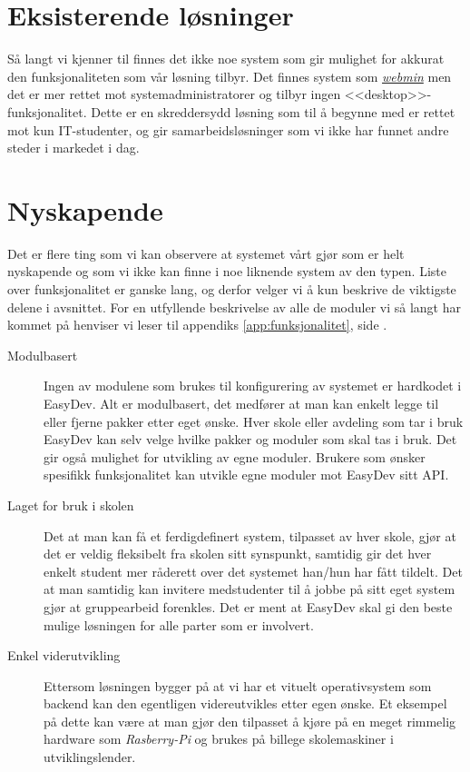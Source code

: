 \section{Eksisterende løsninger}
Så langt vi kjenner til finnes det ikke noe system som gir mulighet for akkurat den funksjonaliteten som vår løsning tilbyr. Det finnes system som \href{http://en.wikipedia.org/wiki/Webmin}{\textit{webmin}} men det er mer rettet mot systemadministratorer og tilbyr ingen <<desktop>>-funksjonalitet. Dette er en skreddersydd løsning som til å begynne med er rettet mot kun IT-studenter, og gir samarbeidsløsninger som vi ikke har funnet andre steder i markedet i dag.

\section{Nyskapende}
Det er flere ting som vi kan observere at systemet vårt gjør som er helt nyskapende og som vi ikke kan finne i noe liknende system av den typen. Liste over funksjonalitet er ganske lang, og derfor velger vi å kun beskrive de viktigste delene i avsnittet. For en utfyllende beskrivelse av alle de moduler vi så langt har kommet på henviser vi leser til appendiks \ref{app:funksjonalitet}, side \pageref{app:funksjonalitet}.


\begin{description}
\item[Modulbasert] Ingen av modulene som brukes til konfigurering av systemet er hardkodet i EasyDev. Alt er modulbasert, det medfører at man kan enkelt legge til eller fjerne pakker etter eget ønske. Hver skole eller avdeling som tar i bruk EasyDev kan selv velge hvilke pakker og moduler som skal tas i bruk. Det gir også mulighet for utvikling av egne moduler. Brukere som ønsker spesifikk funksjonalitet kan utvikle egne moduler mot EasyDev sitt API. 
\item[Laget for bruk i skolen] Det at man kan få et ferdigdefinert system, tilpasset av hver skole, gjør at det er veldig fleksibelt fra skolen sitt synspunkt, samtidig gir det hver enkelt student mer råderett over det systemet han/hun har fått tildelt. Det at man samtidig kan invitere medstudenter til å jobbe på sitt eget system gjør at gruppearbeid forenkles. Det er ment at EasyDev skal gi den beste mulige løsningen for alle parter som er involvert.
\item[Enkel viderutvikling]
Ettersom løsningen bygger på at vi har et vituelt operativsystem som backend kan den egentligen videreutvikles etter egen ønske. Et eksempel på dette kan være at man gjør den tilpasset å kjøre på en meget rimmelig hardware som \textit{Rasberry-Pi} og brukes på billege skolemaskiner i utviklingslender.
\end{description}